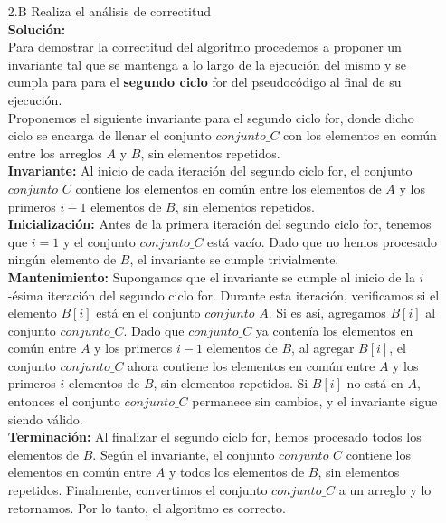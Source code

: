 \documentclass[12pt]{article}
\begin{document}
\begin{itemize}
    \item[2.B] Realiza el análisis de correctitud\\
    \textbf{Solución:}\\
    Para demostrar la correctitud del algoritmo procedemos a proponer un invariante tal que se mantenga a lo largo de la ejecución del mismo y se cumpla para para el \textbf{segundo ciclo} for del pseudocódigo al final de su ejecución.\\
    Proponemos el siguiente invariante para el segundo ciclo for, donde dicho ciclo se encarga de llenar el conjunto $conjunto\_C$ con los elementos en común entre los arreglos $A$ y $B$, sin elementos repetidos.\\
    \textbf{Invariante:} Al inicio de cada iteración del segundo ciclo for, el conjunto $conjunto\_C$ contiene los elementos en común entre los elementos de $A$ y los primeros $i-1$ elementos de $B$, sin elementos repetidos.\\
    \textbf{Inicialización:} Antes de la primera iteración del segundo ciclo for, tenemos que $i=1$ y el conjunto $conjunto\_C$ está vacío. Dado que no hemos procesado ningún elemento de $B$, el invariante se cumple trivialmente.\\
    \textbf{Mantenimiento:} Supongamos que el invariante se cumple al inicio de la $i$-ésima iteración del segundo ciclo for. Durante esta iteración, verificamos si el elemento $B[i]$ está en el conjunto $conjunto\_A$. Si es así, agregamos $B[i]$ al conjunto $conjunto\_C$. Dado que $conjunto\_C$ ya contenía los elementos en común entre $A$ y los primeros $i-1$ elementos de $B$, al agregar $B[i]$, el conjunto $conjunto\_C$ ahora contiene los elementos en común entre $A$ y los primeros $i$ elementos de $B$, sin elementos repetidos. Si $B[i]$ no está en $A$, entonces el conjunto $conjunto\_C$ permanece sin cambios, y el invariante sigue siendo válido.\\
    \textbf{Terminación:} Al finalizar el segundo ciclo for, hemos procesado todos los elementos de $B$. Según el invariante, el conjunto $conjunto\_C$ contiene los elementos en común entre $A$ y todos los elementos de $B$, sin elementos repetidos. Finalmente, convertimos el conjunto $conjunto\_C$ a un arreglo y lo retornamos. Por lo tanto, el algoritmo es correcto.\\


\end{itemize}
\end{document}
